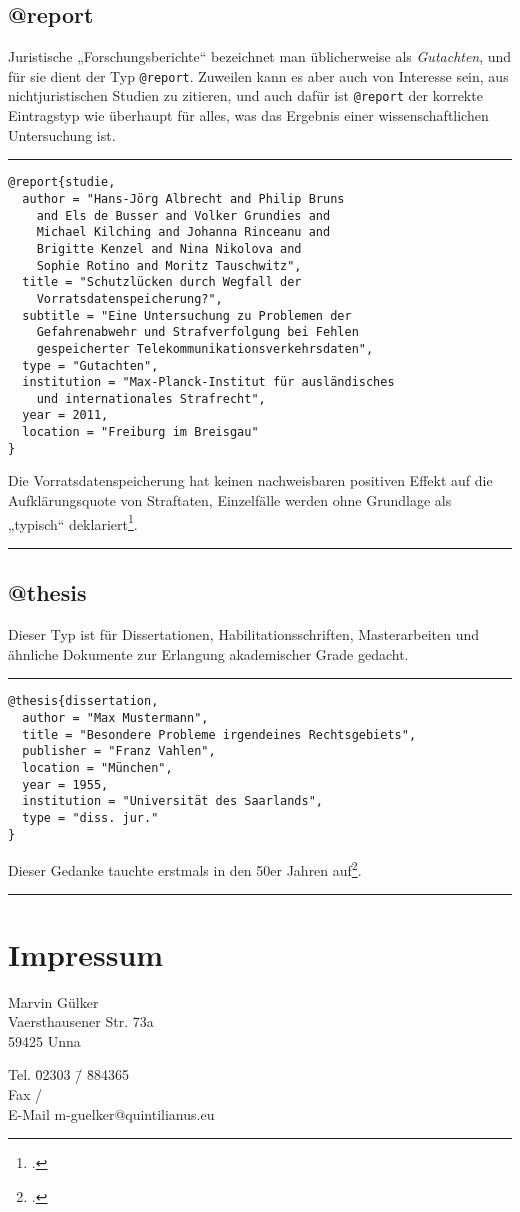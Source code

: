 \documentclass[11pt,a4paper,DIV=calc,draft]{scrartcl}
\newenvironment{rubexample}{\par\vspace{\baselineskip}\hrule\par\begin{refsection}}{\end{refsection}\par\hrule\par\vspace{\baselineskip}}
\begin{document}
\subsection{@report}

Juristische „Forschungsberichte“ bezeichnet man üblicherweise als
\emph{Gutachten}, und für sie dient der Typ \verb+@report+. Zuweilen
kann es aber auch von Interesse sein, aus nichtjuristischen Studien zu
zitieren, und auch dafür ist \verb+@report+ der korrekte Eintragstyp
wie überhaupt für alles, was das Ergebnis einer wissenschaftlichen
Untersuchung ist.

\begin{rubexample}
\begin{verbatim}
@report{studie,
  author = "Hans-Jörg Albrecht and Philip Bruns
    and Els de Busser and Volker Grundies and
    Michael Kilching and Johanna Rinceanu and
    Brigitte Kenzel and Nina Nikolova and
    Sophie Rotino and Moritz Tauschwitz",
  title = "Schutzlücken durch Wegfall der
    Vorratsdatenspeicherung?",
  subtitle = "Eine Untersuchung zu Problemen der
    Gefahrenabwehr und Strafverfolgung bei Fehlen
    gespeicherter Telekommunikationsverkehrsdaten",
  type = "Gutachten",
  institution = "Max-Planck-Institut für ausländisches
    und internationales Strafrecht",
  year = 2011,
  location = "Freiburg im Breisgau"
}
\end{verbatim}

Die Vorratsdatenspeicherung hat keinen nachweisbaren positiven Effekt
auf die Aufklärungsquote von Straftaten, Einzelfälle werden ohne
Grundlage als „typisch“ deklariert\footcite[218f.]{studie}.

\printbibliography
\end{rubexample}

\subsection{@thesis}

Dieser Typ ist für Dissertationen, Habilitationsschriften,
Masterarbeiten und ähnliche Dokumente zur Erlangung akademischer
Grade gedacht.

\begin{rubexample}
\begin{verbatim}
@thesis{dissertation,
  author = "Max Mustermann",
  title = "Besondere Probleme irgendeines Rechtsgebiets",
  publisher = "Franz Vahlen",
  location = "München",
  year = 1955,
  institution = "Universität des Saarlands",
  type = "diss. jur."
}
\end{verbatim}

Dieser Gedanke tauchte erstmals in den 50er Jahren
auf\footcite[123]{dissertation}.

\printbibliography
\end{rubexample}

\section{Impressum}

Marvin Gülker\\
Vaersthausener Str. 73a\\
59425 Unna

\begin{tabbing}
  Tel. \= 02303 \= / \= 884365\\
  Fax   \> / \\
  E-Mail \>     \> m-guelker@quintilianus.eu
\end{tabbing}
\end{document}
